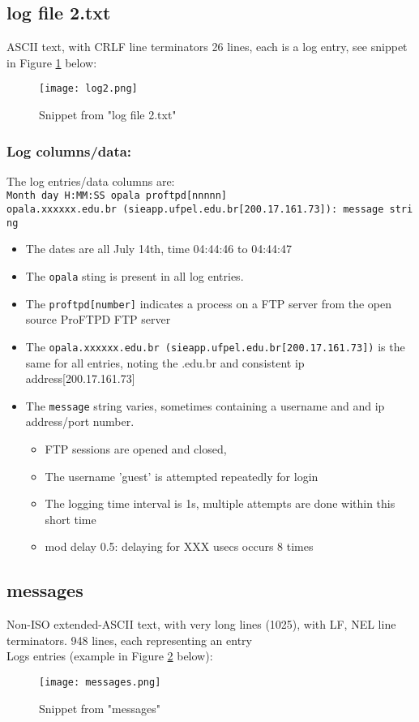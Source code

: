 \documentclass[
	letterpaper, %
	10pt, %
	unnumberedsections, %
	twoside, %
]{APAAssignment}
\begin{document}
\subsection{log file 2.txt}\label{log-file-2.txt}
ASCII text, with CRLF line terminators 26 lines, each is a log entry, see snippet in Figure \ref{fig:log2} below: \\
\begin{figure}[!htp] %
	\centering
	\texttt{[image: log2.png]}
	\caption{Snippet from "log file 2.txt"}	\label{fig:log2}
\end{figure}

\subsubsection{Log columns/data:} The log entries/data columns are: \\
\texttt{Month day H:MM:SS opala proftpd[nnnnn] opala.xxxxxx.edu.br\ (sieapp.ufpel.edu.br[200.17.161.73]):\ message\ string}
\begin{itemize}
  \item The dates are all July 14th, time 04:44:46 to 04:44:47
  \item The \texttt{opala} sting is present in all log entries.
  \item The \texttt{proftpd[number]} indicates a process on a FTP server from the open source ProFTPD FTP server 
  \item The \texttt{opala.xxxxxx.edu.br\ (sieapp.ufpel.edu.br[200.17.161.73])} is the same for all entries, noting the .edu.br and consistent ip address{[}200.17.161.73{]}
  \item The \texttt{message} string varies, sometimes containing a username and and ip address/port number.
  \begin{itemize}
	\item FTP sessions are opened and closed, 
	\item The username 'guest' is attempted repeatedly for login
	\item The logging time interval is 1s, multiple attempts are done within this short time
	\item mod delay 0.5: delaying for XXX usecs occurs 8 times 
  \end{itemize}
\end{itemize}


\subsection{messages}\label{messages}
Non-ISO extended-ASCII text, with very long lines (1025), with LF, NEL line terminators. 948 lines, each representing an entry \\
Logs entries (example in Figure \ref{fig:messages} below): \\
\begin{figure}[!htp] %
	\centering
	\texttt{[image: messages.png]}
	\caption{Snippet from "messages"}	\label{fig:messages}
\end{figure}
\end{document}
